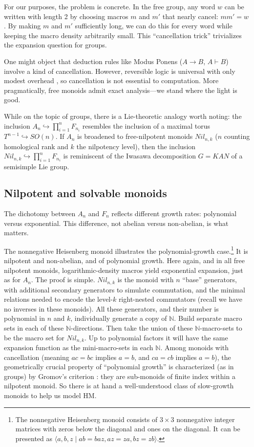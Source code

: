 \documentclass[12pt]{amsart}
\newcommand{\N}{\mathbb{N}}
\theoremstyle{definition}
\theoremstyle{remark}
\begin{document}
For our purposes, the problem is concrete.
In the free group, any word $w$ can be written with length 2 by choosing macros $m$ and $m'$ that nearly cancel: $mm' = w$.
By making $m$ and $m'$ sufficiently long, we can do this for every word while keeping the macro density arbitrarily small.
This ``cancellation trick'' trivializes the expansion question for groups.

One might object that deduction rules like Modus Ponens ($A \to B$, $A \vdash B$) involve a kind of cancellation.
However, reversible logic is universal with only modest overhead \cite{Bennett1973}, so cancellation is not essential to computation.
More pragmatically, free monoids admit exact analysis---we stand where the light is good.

While on the topic of groups, there is a Lie-theoretic analogy worth noting: the inclusion $A_n \hookrightarrow \prod_{i=1}^n F_{n_i}$ resembles the inclusion of a maximal torus $T^{n-1} \hookrightarrow SO(n)$.
If $A_n$ is broadened to free-nilpotent monoids $Nil_{n,k}$ ($n$ counting homological rank and $k$ the nilpotency level), then the inclusion $Nil_{n,k} \hookrightarrow \prod_{i=1}^n F_{n_i}$ is reminiscent of the Iwasawa decomposition $G = KAN$ of a semisimple 
Lie group.

\subsection{Nilpotent and solvable monoids}
\label{nilpotent_discussion}

The dichotomy between $A_n$ and $F_n$ reflects different growth rates: polynomial versus exponential.
This difference, not abelian versus non-abelian, is what matters.

The nonnegative Heisenberg monoid illustrates the polynomial-growth case.\footnote{The nonnegative Heisenberg monoid consists of $3 \times 3$ nonnegative integer matrices with zeros below the diagonal and ones on the diagonal.
It can be presented as $\langle a, b, z \mid ab = baz, az = za, bz = zb \rangle$.}
It is nilpotent and non-abelian, and of polynomial growth.
Here again, and in all free nilpotent monoids, logarithmic-density macros yield exponential expansion, just as for $A_n$.
The proof is simple.
$Nil_{n,k}$ is the monoid with $n$ ``base'' generators, with additional secondary generators to simulate commutation, and the minimal relations needed to encode the level-$k$ right-nested commutators (recall we have no inverses in these monoids).
All these generators, and their number is polynomial in $n$ and $k$, individually generate a copy of $\N$.
Build separate macro sets in each of these $\N$-directions.
Then take the union of these $\N$-macro-sets to be the macro set for $Nil_{n,k}$.
Up to polynomial factors it will have the same expansion function as the mini-macro-sets in each $\N$.
Among monoids with cancellation (meaning $ac = bc$ implies $a = b$, and $ca = cb$ implies $a = b$), the geometrically crucial property of ``polynomial growth'' is characterized (as in groups) by Gromov's criterion \cite{Gromov1981}: they are sub-monoids of finite index within a nilpotent monoid.
So there is at hand a well-understood class of slow-growth monoids to help us model HM.
\end{document}
